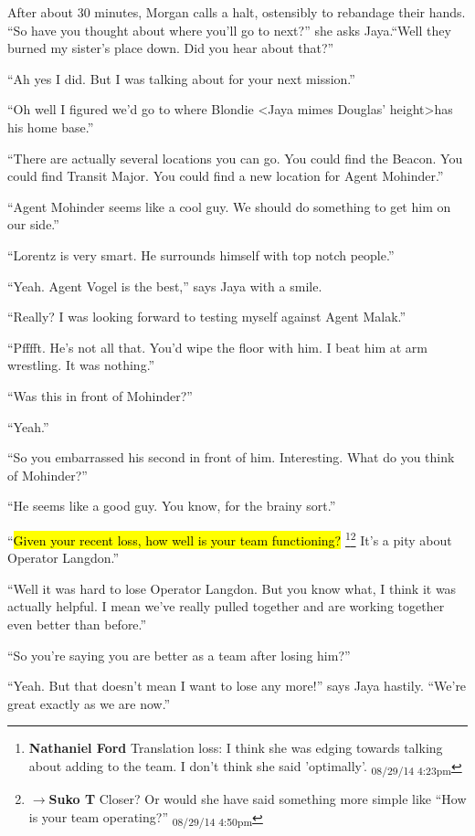 After about 30 minutes, Morgan calls a halt, ostensibly to rebandage their hands.  ``So have you thought about where you'll go to next?'' she asks Jaya.``Well they burned my sister's place down.  Did you hear about that?''

``Ah yes I did.  But I was talking about for your next mission.''

``Oh well I figured we'd go to where Blondie \textless Jaya mimes Douglas' height\textgreater  has his home base.''

``There are actually several locations you can go.  You could find the Beacon.  You could find Transit Major.  You could find a new location for Agent Mohinder.''

``Agent Mohinder seems like a cool guy.  We should do something to get him on our side.''

``Lorentz is very smart.  He surrounds himself with top notch people.''

``Yeah.  Agent Vogel is the best,'' says Jaya with a smile.

``Really?  I was looking forward to testing myself against Agent Malak.''

``Pfffft.  He's not all that.  You'd wipe the floor with him.  I beat him at arm wrestling.  It was nothing.''

``Was this in front of Mohinder?''

``Yeah.''

``So you embarrassed his second in front of him.  Interesting.  What do you think of Mohinder?''

``He seems like a good guy.  You know, for the brainy sort.''

``\hl{Given your recent loss, how well is your team functioning?} \footnote{\textbf{Nathaniel Ford }Translation loss: I think she was edging towards talking about adding to the team. I don't think she said 'optimally'. \textsubscript{08/29/14 4:23pm}}\footnote{$\rightarrow$\textbf{Suko T }Closer?  Or would she have said something more simple like ``How is your team operating?'' \textsubscript{08/29/14 4:50pm}}   It's a pity about Operator Langdon.''

``Well it was hard to lose Operator Langdon.  But you know what, I think it was actually helpful.  I mean we've really pulled together and are working together even better than before.''

``So you're saying you are better as a team after losing him?''

``Yeah.  But that doesn't mean I want to lose any more!'' says Jaya hastily.  ``We're great exactly as we are now.''

